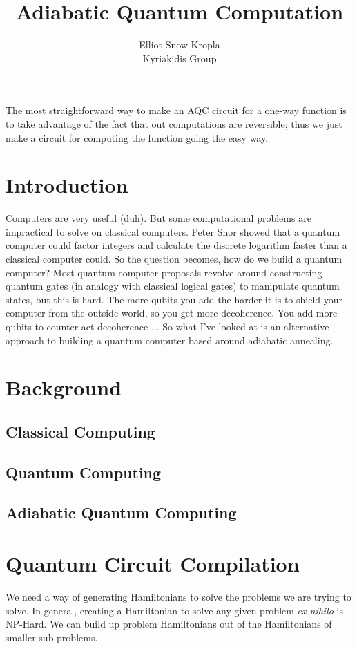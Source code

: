 \documentclass{article}
\title{Adiabatic Quantum Computation}
\author{Elliot Snow-Kropla\\Kyriakidis Group}
\begin{document}
\maketitle
The most straightforward way to make an AQC circuit for a one-way function is to take advantage of the fact that out computations are reversible; thus we just make a circuit for computing the function going the easy way.

\section{Introduction}
Computers are very useful (duh).  But some computational problems are impractical to solve on classical computers.
Peter Shor\cite{shor} showed that a quantum computer could factor integers and calculate the discrete logarithm faster
than a classical computer could.  So the question becomes, how do we build a quantum computer?  Most quantum computer proposals
revolve around constructing quantum gates (in analogy with classical logical gates) to manipulate quantum states, but this is
hard.  The more qubits you add the harder it is to shield your computer from the outside world, so you get more decoherence.  You
add more qubits to counter-act decoherence ...  So what I've looked at is an alternative approach to building a quantum computer
based around adiabatic annealing.

\section{Background}

\subsection{Classical Computing}

\subsection{Quantum Computing}

\subsection{Adiabatic Quantum Computing}

\section{Quantum Circuit Compilation}
We need a way of generating Hamiltonians to solve the problems we are trying to solve.  In general, creating a Hamiltonian to solve
any given problem \emph{ex nihilo} is NP-Hard.  We can build up problem Hamiltonians out of the Hamiltonians of smaller sub-problems.\cite{gluing}
\end{document}
